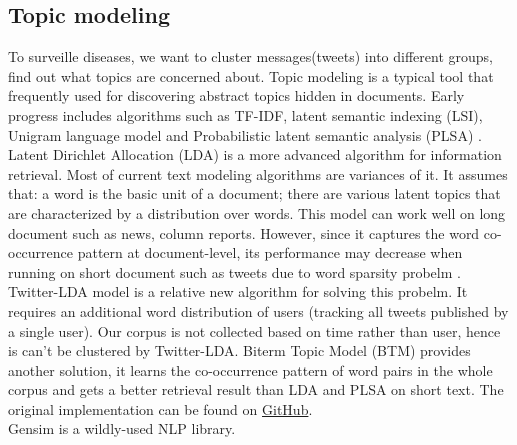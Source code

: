 \subsection{Topic modeling}
\label{sec:topic modeling}
To surveille diseases, we want to cluster messages(tweets) into different groups, find out what topics are concerned about. Topic modeling is a typical tool that frequently used for discovering abstract topics hidden in documents. Early progress includes algorithms such as TF-IDF, latent semantic indexing (LSI), Unigram language model and Probabilistic latent semantic analysis (PLSA) \cite{hofmann1999probabilistic, baeza1999modern}. Latent Dirichlet Allocation (LDA) \cite{blei2003latent} is a more advanced algorithm for information retrieval. Most of current text modeling algorithms are variances of it. It assumes that: a word is the basic unit of a document; there are various latent topics that are characterized by a distribution over words. This model can work well on long document such as news, column reports. However, since it captures the word co-occurrence pattern at document-level, its performance may decrease when running on short document such as tweets due to word sparsity probelm \cite{yan2013biterm}. Twitter-LDA model \cite{zhao2011comparing} is a relative new algorithm for solving this probelm. It requires an additional word distribution of users (tracking all tweets published by a single user). Our corpus is not collected based on time rather than user, hence is can't be clustered by Twitter-LDA. Biterm Topic Model (BTM) \cite{yan2013biterm, cheng2014btm} provides another solution, it learns the co-occurrence pattern of word pairs in the whole corpus and gets a better retrieval result than LDA and PLSA on short text. The original implementation can be found on \href{https://github.com/xiaohuiyan/OnlineBTM}{GitHub}. \\
Gensim \cite{rehurek_lrec} is a wildly-used NLP library.